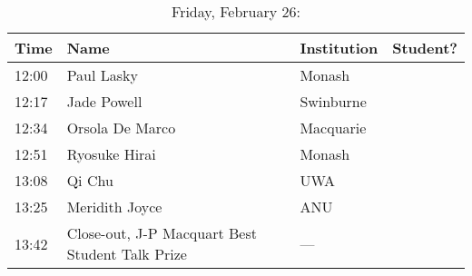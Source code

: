 \documentclass[amsmath,onecolumn]{revtex4-1}
\begin{document}
\begin{table}[!htbp]
	\centering
	\caption{Friday, February 26:}
\begin{tabular}{| l | l | l | c |}
	\hline
	Time & Name  & Institution & Student? \\ 		
	\hline
	12:00 & Paul	Lasky & Monash & \\
	12:17 & Jade	Powell & Swinburne & \\
	12:34 & Orsola	De Marco & Macquarie & \\
	12:51 & Ryosuke	Hirai  & Monash & \\
	13:08 & Qi	Chu & UWA & \\
	13:25 & Meridith	Joyce & ANU  & \\
	13:42 & Close-out, J-P Macquart Best Student Talk Prize & --- & \\
	\hline
\end{tabular}
\end{table}
\end{document}
